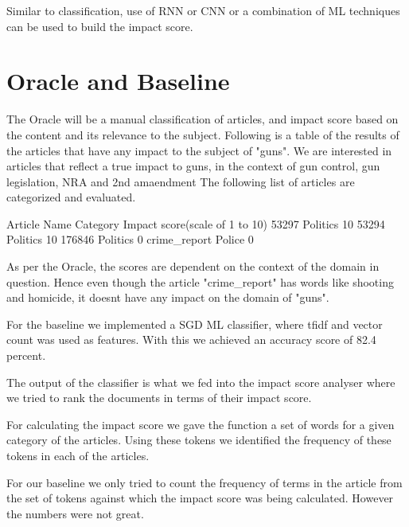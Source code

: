 \documentclass{article}
\begin{document}
Similar to classification, use of RNN or CNN or a combination of ML techniques can be used to build the impact score.

\section*{Oracle and Baseline} %

The Oracle will be a manual classification of articles, and impact score based on the content and its relevance to the subject.
Following is a table of the results of the articles that have any impact to the subject of "guns".
We are interested in articles that reflect a true impact to guns, in the context of gun control, gun legislation, NRA and 2nd amaendment
The following list of articles are categorized and evaluated.

Article Name    Category    Impact score(scale of 1 to 10)
53297           Politics    10
53294           Politics    10
176846          Politics    0
crime_report    Police      0

As per the Oracle, the scores are dependent on the context of the domain in question.
Hence even though the article "crime_report" has words like shooting and homicide, it doesnt have any impact on the domain of "guns".\newline

For the baseline we implemented a SGD ML classifier, where tfidf and vector count was used as features. With this we achieved an accuracy score of 82.4 percent. \newline

The output of the classifier is what we fed into the impact score analyser where we tried to rank the documents in terms of their impact score. \newline

For calculating the impact score we gave the function a set of words for a given category of the articles. Using these tokens we identified the frequency of these tokens in each of the articles. \newline

For our baseline we only tried to count the frequency of terms in the article from the set of tokens against which the impact score was being calculated.  However the numbers were not great.\newline
\end{document}
